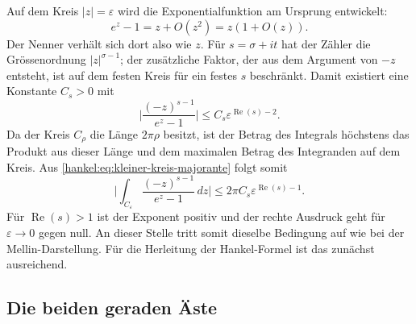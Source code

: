 Auf dem Kreis $|z|=\varepsilon$ wird die Exponentialfunktion am Ursprung entwickelt:
\begin{equation}
e^z-1
=
z+O(z^2)
=
z(1+O(z)).
\label{hankel:eq:exp-klein}
\end{equation}
Der Nenner verhält sich dort also wie $z$. 
Für $s=\sigma+it$ hat der Zähler die Grössenordnung $|z|^{\sigma-1}$; der zusätzliche Faktor, der aus dem
Argument von $-z$ entsteht, ist auf dem festen Kreis für ein festes $s$ beschränkt. 
Damit existiert eine Konstante $C_s>0$ mit
\begin{equation}
\biggl|
\frac{(-z)^{s-1}}{e^z-1}
\biggr|
\leq
C_s\varepsilon^{\operatorname{Re}(s)-2}.
\label{hankel:eq:kleiner-kreis-majorante}
\end{equation}
Da der Kreis $C_\rho$ die Länge $2\pi\rho$ besitzt, ist der Betrag des Integrals höchstens das Produkt aus dieser Länge und dem maximalen Betrag des Integranden auf dem Kreis. 
Aus \eqref{hankel:eq:kleiner-kreis-majorante} folgt somit
\begin{equation}
\biggl|
\int_{C_\varepsilon}
\frac{(-z)^{s-1}}{e^z-1}
\,dz
\biggr|
\leq
2\pi C_s\varepsilon^{\operatorname{Re}(s)-1}.
\label{hankel:eq:kleiner-kreis-ml}
\end{equation}
Für $\operatorname{Re}(s)>1$ ist der Exponent positiv und der rechte Ausdruck geht für $\varepsilon\to0$ gegen null. 
An dieser Stelle tritt somit dieselbe Bedingung auf wie bei der Mellin-Darstellung. 
Für die Herleitung der Hankel-Formel ist das zunächst ausreichend.

\subsection{Die beiden geraden Äste}

